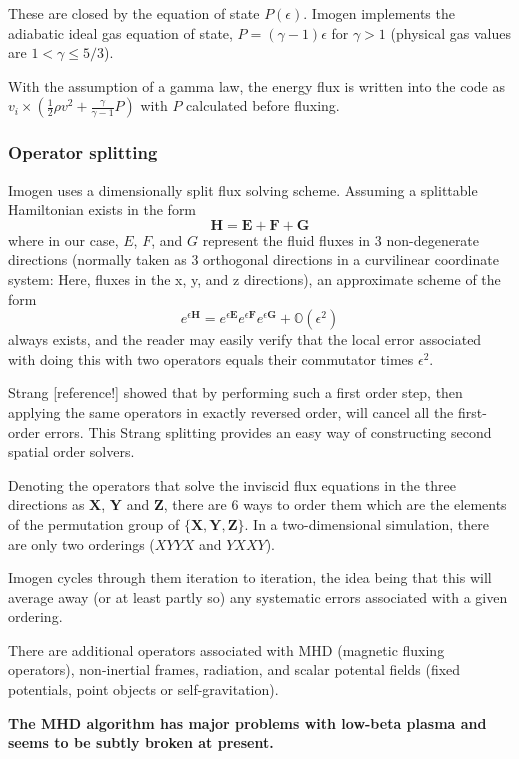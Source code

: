 \documentclass[letterpaper,12pt,twocolumn]{article}
\begin{document}
These are closed by the equation of state $P(\epsilon)$. Imogen implements the
adiabatic ideal gas equation of state, $P = (\gamma-1)\epsilon$ for $\gamma > 1$
(physical gas values are $1 < \gamma \le 5/3$).

With the assumption of a gamma law, the energy flux is written into the
code as $v_i \times (\frac{1}{2} \rho v^2 + \frac{\gamma}{\gamma-1}P)$ with $P$ calculated
before fluxing.

\subsubsection{Operator splitting}

Imogen uses a dimensionally split flux solving scheme. Assuming a splittable Hamiltonian
exists in the form
\[\mathbf{H} = \mathbf{E} + \mathbf{F} + \mathbf{G}\]
where in our case, $E$, $F$, and $G$ represent the fluid fluxes in 3 non-degenerate
directions (normally taken as 3 orthogonal directions in a curvilinear coordinate
system: Here, fluxes in the x, y, and z directions), an approximate scheme of the form
\[e^{\epsilon \mathbf{H}} = e^{\epsilon \mathbf{E}} e^{\epsilon \mathbf{F}}
e^{\epsilon \mathbf{G}} + \mathbb{O}(\epsilon^2) \]
always exists, and the reader may easily verify that the local error associated with
doing this with two operators equals their commutator times $\epsilon^2$.

Strang [reference!] showed that by performing such a first order step, then
applying the same operators in exactly reversed order, will cancel all the first-order
errors. This Strang splitting provides an easy way of constructing second spatial order
solvers.

Denoting the operators that solve the inviscid flux equations in the three directions as
$\mathbf{X}$, $\mathbf{Y}$ and $\mathbf{Z}$, there are 6 ways to order them which are the
elements of the permutation group of $\{ \mathbf{X}, \mathbf{Y}, \mathbf{Z} \}$.
In a two-dimensional simulation, there are only two orderings ($XYYX$ and $YXXY$).

Imogen cycles through them iteration to iteration, the idea being that this will average
away (or at least partly so) any systematic errors associated with a given ordering.

There are additional operators associated with MHD (magnetic fluxing operators), non-inertial
frames, radiation, and scalar potental fields (fixed potentials, point objects or
self-gravitation).

\textbf{The MHD algorithm has major problems with low-beta plasma and seems to be
subtly broken at present.}
\end{document}
